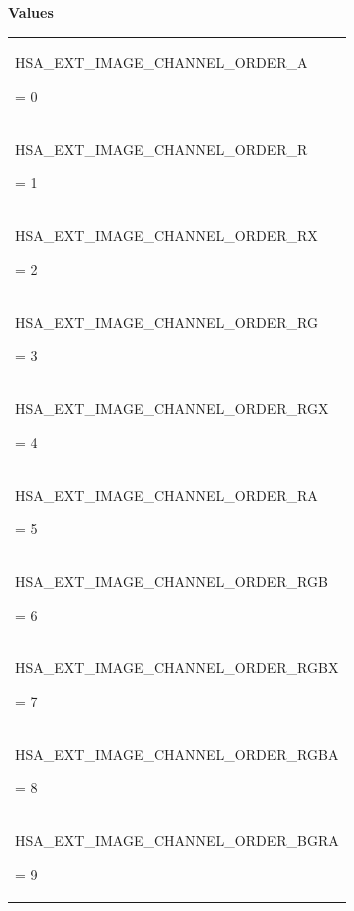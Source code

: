 \documentclass[final]{book}
\newcommand{\reftyp}[1]{#1}
\newcommand{\refenu}[1]{\reftyp{#1}}
\begin{document}
\noindent\textbf{Values}\\[-5mm]
\begin{longtable}{@{\hspace{2em}}p{\linewidth-2em}}
\hspace{-2em}\hypertarget{group__images_1ggabaced4fb1f3b9fdaa978e143af5ff055aa68ce325d9662ff1a1c78598835c8d55}{\refenu{HSA_\-EXT_\-IMAGE_\-CHANNEL_\-ORDER_\-A}} = 0\\[2mm]
\hspace{-2em}\hypertarget{group__images_1ggabaced4fb1f3b9fdaa978e143af5ff055ae6f5e256120da86e073db6a996e778d7}{\refenu{HSA_\-EXT_\-IMAGE_\-CHANNEL_\-ORDER_\-R}} = 1\\[2mm]
\hspace{-2em}\hypertarget{group__images_1ggabaced4fb1f3b9fdaa978e143af5ff055ad22499f0285b97596caa1a316f839ace}{\refenu{HSA_\-EXT_\-IMAGE_\-CHANNEL_\-ORDER_\-RX}} = 2\\[2mm]
\hspace{-2em}\hypertarget{group__images_1ggabaced4fb1f3b9fdaa978e143af5ff055a49185aef99188ff46b53d4da23614798}{\refenu{HSA_\-EXT_\-IMAGE_\-CHANNEL_\-ORDER_\-RG}} = 3\\[2mm]
\hspace{-2em}\hypertarget{group__images_1ggabaced4fb1f3b9fdaa978e143af5ff055a59e32fe3e15c24a407c5f1e56a6935f4}{\refenu{HSA_\-EXT_\-IMAGE_\-CHANNEL_\-ORDER_\-RGX}} = 4\\[2mm]
\hspace{-2em}\hypertarget{group__images_1ggabaced4fb1f3b9fdaa978e143af5ff055a7ec545d6291f17a9a779b6f673fad718}{\refenu{HSA_\-EXT_\-IMAGE_\-CHANNEL_\-ORDER_\-RA}} = 5\\[2mm]
\hspace{-2em}\hypertarget{group__images_1ggabaced4fb1f3b9fdaa978e143af5ff055ae3d2eed3398c973eab1e66e1b92a8efe}{\refenu{HSA_\-EXT_\-IMAGE_\-CHANNEL_\-ORDER_\-RGB}} = 6\\[2mm]
\hspace{-2em}\hypertarget{group__images_1ggabaced4fb1f3b9fdaa978e143af5ff055a3d93bdf6b20f6409a9d684646908bfe1}{\refenu{HSA_\-EXT_\-IMAGE_\-CHANNEL_\-ORDER_\-RGBX}} = 7\\[2mm]
\hspace{-2em}\hypertarget{group__images_1ggabaced4fb1f3b9fdaa978e143af5ff055a0c5e8dc0eef9af781786ef67ee3702df}{\refenu{HSA_\-EXT_\-IMAGE_\-CHANNEL_\-ORDER_\-RGBA}} = 8\\[2mm]
\hspace{-2em}\hypertarget{group__images_1ggabaced4fb1f3b9fdaa978e143af5ff055a8f8724381ae9dfe592a15808ebe8c1d2}{\refenu{HSA_\-EXT_\-IMAGE_\-CHANNEL_\-ORDER_\-BGRA}} = 9\\[2mm]

\end{longtable}
\end{document}
